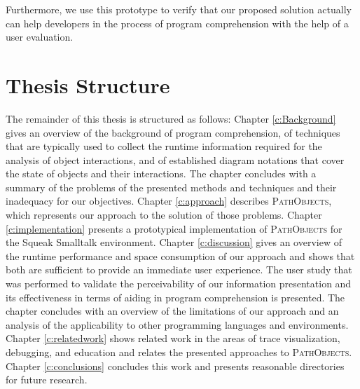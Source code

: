 Furthermore, we use this prototype to verify that our proposed solution actually can help developers in the process of program comprehension with the help of a user evaluation.

\section{Thesis Structure}
The remainder of this thesis is structured as follows:
Chapter \ref{c:Background} gives an overview of the background of program comprehension, of techniques that are typically used to collect the runtime information required for the analysis of object interactions, and of established diagram notations that cover the state of objects and their interactions.
The chapter concludes with a summary of the problems of the presented methods and techniques and their inadequacy for our objectives.
Chapter \ref{c:approach} describes \textsc{PathObjects}, which represents our approach to the solution of those problems.
Chapter \ref{c:implementation} presents a prototypical implementation of \textsc{PathObjects} for the Squeak Smalltalk environment.
Chapter \ref{c:discussion} gives an overview of the runtime performance and space consumption of our approach and shows that both are sufficient to provide an immediate user experience.
The user study that was performed to validate the perceivability of our information presentation and its effectiveness in terms of aiding in program comprehension is presented.
The chapter concludes with an overview of the limitations of our approach and an analysis of the applicability to other programming languages and environments.
Chapter \ref{c:relatedwork} shows related work in the areas of trace visualization, debugging, and education and relates the presented approaches to \textsc{PathObjects}.
Chapter \ref{c:conclusions} concludes this work and presents reasonable directories for future research.